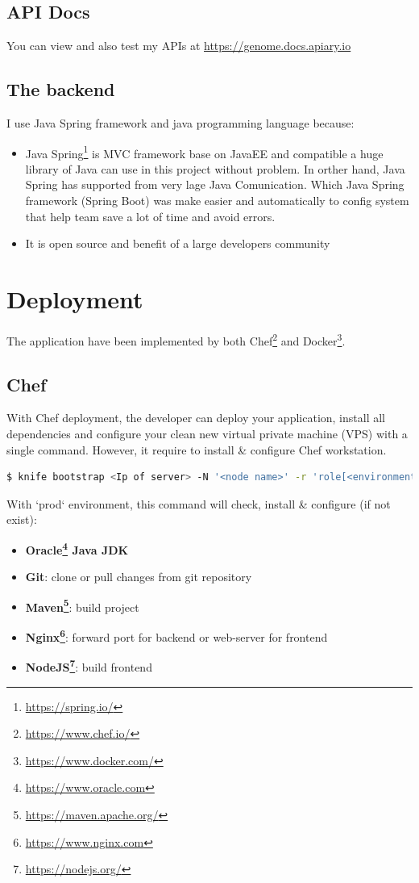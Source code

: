 \documentclass[a4paper,12pt]{article}
\begin{document}
\subsection{API Docs}
You can view and also test my APIs at \url{https://genome.docs.apiary.io}

\subsection{The backend}
I use Java Spring framework and java programming language because:
\begin{itemize}
	\item Java Spring\footnote{ \url{https://spring.io/}} is MVC framework base on JavaEE and compatible a huge library of Java can use in this project without problem. In orther hand, Java Spring has supported from very lage Java Comunication. Which Java Spring framework (Spring Boot) was make easier and automatically to config system that help team save a lot of time and avoid errors.
	\item It is open source and benefit of a large developers community
\end{itemize}

\section{Deployment}
The application have been implemented by both Chef\footnote{ \url{https://www.chef.io/}} and Docker\footnote{ \url{https://www.docker.com/}}.
\subsection{Chef}
With Chef deployment, the developer can deploy your application, install all dependencies and configure your clean new virtual private machine (VPS) with a single command. However, it require to install \& configure Chef workstation. 
\\
\begin{lstlisting}[language=bash]
  $ knife bootstrap <Ip of server> -N '<node name>' -r 'role[<environment>]' --ssh-user <user name on node> --sudo --ssh-identity-file <ssh private credential> --secret-file <location of secret file>
\end{lstlisting}

With `prod` environment, this command will check, install \& configure (if not exist):
\begin{itemize}
	\item \textbf{Oracle\footnote{ \url{https://www.oracle.com}} Java JDK}
	\item \textbf{Git}: clone or pull changes from git repository
	\item \textbf{Maven\footnote{ \url{https://maven.apache.org/}}}: build project
	\item \textbf{Nginx\footnote{ \url{https://www.nginx.com}}}: forward port for backend or web-server for frontend
	\item \textbf{NodeJS\footnote{ \url{https://nodejs.org/}}}: build frontend
\end{itemize}
\end{document}
